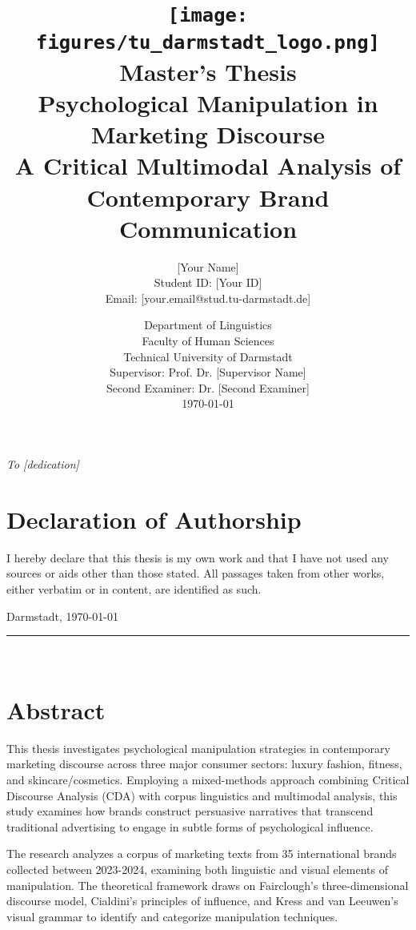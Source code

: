 \documentclass[12pt,a4paper,twoside,openright]{book}
\title{
    \vspace{-2cm}
    \texttt{[image: figures/tu\_darmstadt\_logo.png]}\\[1cm]
    \textbf{\Large Master's Thesis}\\[0.5cm]
    \textbf{\Huge Psychological Manipulation in Marketing Discourse}\\[0.5cm]
    \Large A Critical Multimodal Analysis of Contemporary Brand Communication
}
\author{
    \Large [Your Name]\\[0.3cm]
    \normalsize Student ID: [Your ID]\\[0.3cm]
    \normalsize Email: [your.email@stud.tu-darmstadt.de]
}
\date{
    \vspace{1cm}
    \Large Department of Linguistics\\
    Faculty of Human Sciences\\
    Technical University of Darmstadt\\[1cm]
    \large Supervisor: Prof. Dr. [Supervisor Name]\\
    Second Examiner: Dr. [Second Examiner]\\[1cm]
    \today
}
\begin{document}
\frontmatter
\maketitle

\cleardoublepage
\thispagestyle{empty}
\vspace*{\fill}
\begin{center}
    \textit{To [dedication]}
\end{center}
\vspace*{\fill}

\cleardoublepage
\chapter*{Declaration of Authorship}

I hereby declare that this thesis is my own work and that I have not used any sources or aids other than those stated. All passages taken from other works, either verbatim or in content, are identified as such.

\vspace{2cm}
\noindent
Darmstadt, \today

\vspace{2cm}
\noindent
\rule{6cm}{0.4pt}\\
[Your Name]

\cleardoublepage
\chapter*{Abstract}

This thesis investigates psychological manipulation strategies in contemporary marketing discourse across three major consumer sectors: luxury fashion, fitness, and skincare/cosmetics. Employing a mixed-methods approach combining Critical Discourse Analysis (CDA) with corpus linguistics and multimodal analysis, this study examines how brands construct persuasive narratives that transcend traditional advertising to engage in subtle forms of psychological influence.

The research analyzes a corpus of marketing texts from 35 international brands collected between 2023-2024, examining both linguistic and visual elements of manipulation. The theoretical framework draws on Fairclough's three-dimensional discourse model, Cialdini's principles of influence, and Kress and van Leeuwen's visual grammar to identify and categorize manipulation techniques.
\end{document}
